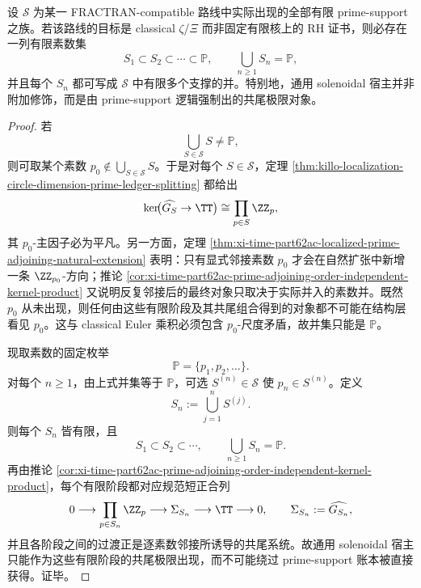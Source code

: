 \begin{theorem}[共尾素数耗尽]\label{thm:xi-time-part62ae-cofinal-prime-exhaustion}
设 \(\mathscr S\) 为某一 FRACTRAN-compatible 路线中实际出现的全部有限 prime-support 之族。若该路线的目标是 classical \(\zeta\)/\(\Xi\) 而非固定有限核上的 RH 证书，则必存在一列有限素数集
\[
S_1\subset S_2\subset \cdots \subset \mathbb P,
\qquad
\bigcup_{n\ge 1}S_n=\mathbb P,
\]
并且每个 \(S_n\) 都可写成 \(\mathscr S\) 中有限多个支撑的并。特别地，通用 solenoidal 宿主并非附加修饰，而是由 prime-support 逻辑强制出的共尾极限对象。
\end{theorem}
\begin{proof}
若
\[
\bigcup_{S\in\mathscr S}S\neq \mathbb P,
\]
则可取某个素数 \(p_0\notin \bigcup_{S\in\mathscr S}S\)。于是对每个 \(S\in\mathscr S\)，定理 \ref{thm:killo-localization-circle-dimension-prime-ledger-splitting} 都给出
\[
\ker\!\bigl(\widehat{G_S}\to\TT\bigr)\cong \prod_{p\in S}\ZZ_p,
\]
其 \(p_0\)-主因子必为平凡。另一方面，定理 \ref{thm:xi-time-part62ac-localized-prime-adjoining-natural-extension} 表明：只有显式邻接素数 \(p_0\) 才会在自然扩张中新增一条 \(\ZZ_{p_0}\)-方向；推论 \ref{cor:xi-time-part62ac-prime-adjoining-order-independent-kernel-product} 又说明反复邻接后的最终对象只取决于实际并入的素数并。既然 \(p_0\) 从未出现，则任何由这些有限阶段及其共尾组合得到的对象都不可能在结构层看见 \(p_0\)。这与 classical Euler 乘积必须包含 \(p_0\)-尺度矛盾，故并集只能是 \(\mathbb P\)。

现取素数的固定枚举
\[
\mathbb P=\{p_1,p_2,\dots\}.
\]
对每个 \(n\ge 1\)，由上式并集等于 \(\mathbb P\)，可选 \(S^{(n)}\in\mathscr S\) 使 \(p_n\in S^{(n)}\)。定义
\[
S_n:=\bigcup_{j=1}^{n}S^{(j)}.
\]
则每个 \(S_n\) 皆有限，且
\[
S_1\subset S_2\subset\cdots,
\qquad
\bigcup_{n\ge 1}S_n=\mathbb P.
\]
再由推论 \ref{cor:xi-time-part62ac-prime-adjoining-order-independent-kernel-product}，每个有限阶段都对应规范短正合列
\[
0\longrightarrow \prod_{p\in S_n}\ZZ_p
\longrightarrow \Sigma_{S_n}
\longrightarrow \TT
\longrightarrow 0,
\qquad
\Sigma_{S_n}:=\widehat{G_{S_n}},
\]
并且各阶段之间的过渡正是逐素数邻接所诱导的共尾系统。故通用 solenoidal 宿主只能作为这些有限阶段的共尾极限出现，而不可能绕过 prime-support 账本被直接获得。证毕。
\end{proof}

